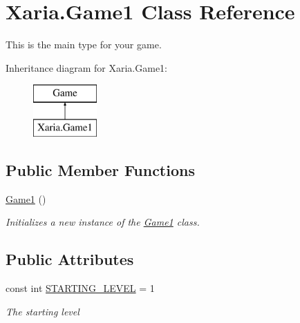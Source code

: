 \hypertarget{classXaria_1_1Game1}{}\section{Xaria.\+Game1 Class Reference}
\label{classXaria_1_1Game1}


This is the main type for your game.  


Inheritance diagram for Xaria.\+Game1\+:\begin{figure}[H]
\begin{center}
\leavevmode
\includegraphics[height=2.000000cm]{classXaria_1_1Game1}
\end{center}
\end{figure}
\subsection*{Public Member Functions}
\begin{DoxyCompactItemize}
\item 
\hyperlink{classXaria_1_1Game1_aa7b8268d52c2f0435734c83f3d76f266}{Game1} ()
\begin{DoxyCompactList}\small\item\em Initializes a new instance of the \hyperlink{classXaria_1_1Game1}{Game1} class. \end{DoxyCompactList}\end{DoxyCompactItemize}
\subsection*{Public Attributes}
\begin{DoxyCompactItemize}
\item 
const int \hyperlink{classXaria_1_1Game1_a7f2a6b5ec19c43c24060e8ff69349424}{S\+T\+A\+R\+T\+I\+N\+G\+\_\+\+L\+E\+V\+EL} = 1
\begin{DoxyCompactList}\small\item\em The starting level \end{DoxyCompactList}\end{DoxyCompactItemize}
